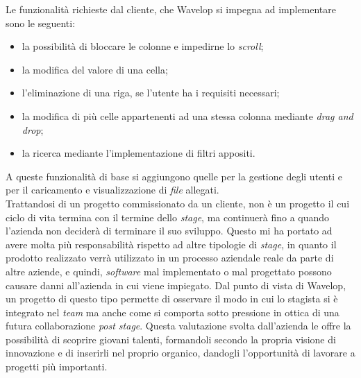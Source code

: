 Le funzionalità richieste dal cliente, che Wavelop si impegna ad implementare sono le seguenti:
\begin{itemize}
  \item la possibilità di bloccare le colonne e impedirne lo \emph{scroll};
  \item la modifica del valore di una cella;
  \item l'eliminazione di una riga, se l'utente ha i requisiti necessari;
  \item la modifica di più celle appartenenti ad una stessa colonna mediante \emph{drag and drop};
  \item la ricerca mediante l'implementazione di filtri appositi.
\end{itemize}
A queste funzionalità di base si aggiungono quelle per la gestione degli utenti e per il caricamento e visualizzazione di \emph{file} allegati. \\

Trattandosi di un progetto commissionato da un cliente, non è un progetto il cui ciclo di vita termina con il termine dello \emph{stage}, ma continuerà fino a quando l'azienda non deciderà di terminare il suo sviluppo. 
Questo mi ha portato ad avere molta più responsabilità rispetto ad altre tipologie di \emph{stage}, in quanto il prodotto realizzato verrà utilizzato in un processo aziendale reale da parte di altre aziende, e quindi, \emph{software} mal implementato o mal progettato possono causare danni all'azienda in cui viene impiegato. 
Dal punto di vista di Wavelop, un progetto di questo tipo permette di osservare il modo in cui lo stagista si è integrato nel \emph{team} ma anche come si comporta sotto pressione in ottica di una futura collaborazione \emph{post stage}. 
Questa valutazione svolta dall'azienda le offre la possibilità di scoprire giovani talenti, formandoli secondo la propria visione di innovazione e di inserirli nel proprio organico, dandogli l'opportunità di lavorare a progetti più importanti.

